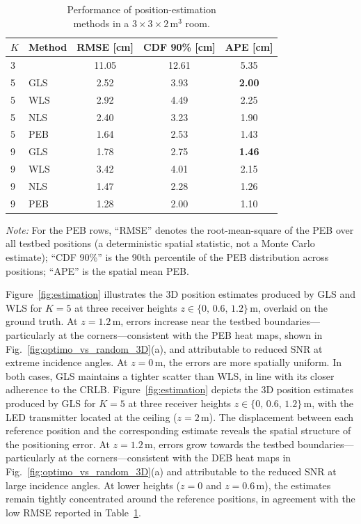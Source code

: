 \documentclass[journal]{IEEEtran}
\newcommand{\added}[1]{{\color{blue}#1}}
\newcommand{\deleted}[1]{{\color{red}#1}}
\begin{document}
\begin{table}[t]
\centering
\caption{Performance of position-estimation\\ methods in a \(3\times3\times2\,\mathrm{m^3}\) room.}
\label{tab:estimation_performance}
\begin{tabular}{|l| l |c |c| c|}
\hline
\textbf{$K$} & \textbf{Method} & \textbf{RMSE [cm]} & \textbf{CDF 90\% [cm]} & \textbf{APE [cm]} \\ \hline
3 & \cite{Chassagne2025} & 11.05 & 12.61 &  5.35 \\ \hline
5 & GLS   &  2.52 &  3.93 &  \textbf{2.00} \\ \hline
5 & WLS   &  2.92 &  4.49 &  2.25 \\ \hline
5 & NLS   &  2.40 &  3.23 &  1.90 \\ \hline
5 & PEB   &  1.64 &  2.53 &  1.43 \\ \hline
9 & GLS   &  1.78 &  2.75 &  \textbf{1.46} \\ \hline
9 & WLS   &  3.42 &  4.01 &  2.15 \\ \hline
9 & NLS   &  1.47 &  2.28 &  1.26 \\ \hline
9 & PEB   &  1.28 &  2.00 &  1.10 \\ \hline
\end{tabular}
\vspace{2pt}
\added{\footnotesize\textit{Note:} For the PEB rows, ``RMSE'' denotes the root-mean-square of the PEB over all testbed positions (a deterministic spatial statistic, not a Monte Carlo estimate); ``CDF 90\%'' is the 90th percentile of the PEB distribution across positions; ``APE'' is the spatial mean PEB.}
\end{table}

\deleted{Figure~\ref{fig:estimation} illustrates the 3D position estimates produced by GLS and WLS for $K=5$ at three receiver heights $z\in\{0,\,0.6,\,1.2\}\,\mathrm{m}$, overlaid on the ground truth. At $z=1.2\,\mathrm{m}$, errors increase near the testbed boundaries---particularly at the corners---consistent with the PEB heat maps, shown in Fig.~\ref{fig:optimo_vs_random_3D}(a), and attributable to reduced SNR at extreme incidence angles. At $z=0\,\mathrm{m}$, the errors are more spatially uniform. In both cases, GLS maintains a tighter scatter than WLS, in line with its closer adherence to the CRLB.}
\added{Figure~\ref{fig:estimation} depicts the 3D position estimates produced by GLS for $K{=}5$ at three receiver heights $z\in\{0,\,0.6,\,1.2\}\,\mathrm{m}$, with the LED transmitter located at the ceiling ($z=2\,\mathrm{m}$). The displacement between each reference position and the corresponding estimate reveals the spatial structure of the positioning error. At $z=1.2\,\mathrm{m}$, errors grow towards the testbed boundaries---particularly at the corners---consistent with the DEB heat maps in Fig.~\ref{fig:optimo_vs_random_3D}(a) and attributable to the reduced SNR at large incidence angles. At lower heights ($z=0$ and $z=0.6\,\mathrm{m}$), the estimates remain tightly concentrated around the reference positions, in agreement with the low RMSE reported in Table~\ref{tab:estimation_performance}.}
\end{document}
